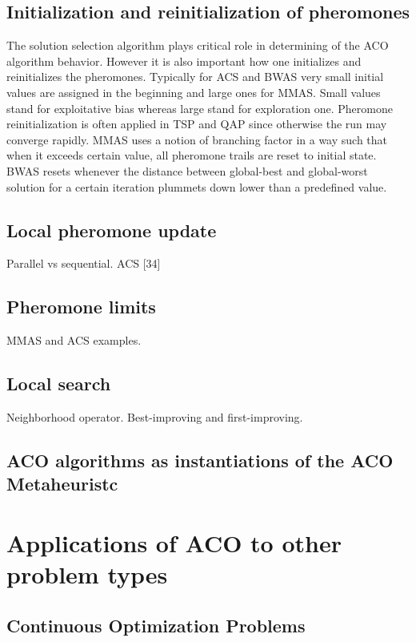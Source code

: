 \documentclass[12pt]{article}
\begin{document}
\subsection{Initialization and reinitialization of pheromones}

The solution selection algorithm plays critical role in determining of the ACO algorithm behavior. However it is also important how one initializes and reinitializes the pheromones. Typically for ACS and BWAS very small initial values are assigned in the beginning and large ones for MMAS. Small values stand for exploitative bias whereas large stand for exploration one. Pheromone reinitialization is often applied in TSP and QAP since otherwise the run may converge rapidly. MMAS uses a notion of branching factor in a way such that when it exceeds certain value, all pheromone trails are reset to initial state. BWAS resets whenever the distance between global-best and global-worst solution for a certain iteration plummets down lower than a predefined value.




\subsection{Local pheromone update}
Parallel vs sequential.
ACS [34]

\subsection{Pheromone limits}
MMAS and ACS examples.

\subsection{Local search}
Neighborhood operator.
Best-improving and first-improving.

\subsection{ACO algorithms as instantiations of the ACO Metaheuristc}

\section{Applications of ACO to other problem types}

\subsection{Continuous Optimization Problems}
\end{document}
